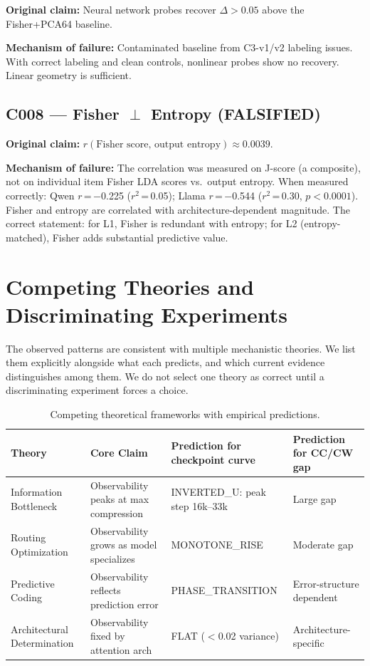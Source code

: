 \documentclass[11pt]{article}
\begin{document}
\textbf{Original claim:} Neural network probes recover $\Delta > 0.05$ above the
Fisher+PCA64 baseline.

\textbf{Mechanism of failure:} Contaminated baseline from C3-v1/v2 labeling issues.
With correct labeling and clean controls, nonlinear probes show no recovery.
Linear geometry is sufficient.

\subsection{C008 --- Fisher $\perp$ Entropy (FALSIFIED)}

\textbf{Original claim:} $r(\text{Fisher score},\, \text{output entropy}) \approx 0.0039$.

\textbf{Mechanism of failure:} The correlation was measured on J-score (a composite),
not on individual item Fisher LDA scores vs.\ output entropy. When measured correctly:
Qwen $r$\,=\,$-$0.225 ($r^2$\,=\,0.05); Llama $r$\,=\,$-$0.544 ($r^2$\,=\,0.30,
$p < 0.0001$). Fisher and entropy are correlated with architecture-dependent magnitude.
The correct statement: for L1, Fisher is redundant with entropy; for L2
(entropy-matched), Fisher adds substantial predictive value.

\section{Competing Theories and Discriminating Experiments}
\label{sec:competing}

The observed patterns are consistent with multiple mechanistic theories. We list them
explicitly alongside what each predicts, and which current evidence distinguishes among
them. We do not select one theory as correct until a discriminating experiment forces
a choice.

\begin{table}[h!]
\centering
\caption{Competing theoretical frameworks with empirical predictions.}
\begin{tabular}{L{2.8cm}L{3.5cm}L{3.5cm}L{2.8cm}}
\toprule
Theory & Core Claim & Prediction for checkpoint curve & Prediction for CC/CW gap \\
\midrule
Information Bottleneck & Observability peaks at max compression & INVERTED\_U: peak step 16k--33k & Large gap \\
Routing Optimization & Observability grows as model specializes & MONOTONE\_RISE & Moderate gap \\
Predictive Coding & Observability reflects prediction error & PHASE\_TRANSITION & Error-structure dependent \\
Architectural Determination & Observability fixed by attention arch & FLAT ($<$0.02 variance) & Architecture-specific \\
\bottomrule
\end{tabular}
\end{table}
\end{document}
